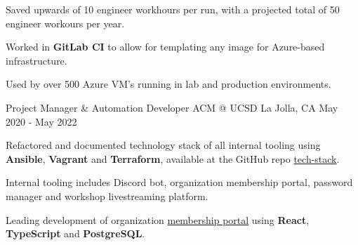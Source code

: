 \begin{cventries}
{\begin{cvitems}
        \item {Saved upwards of 10 engineer workhours per run, with a projected total of 50 engineer workours per year.}
        \item {Worked in \textbf{GitLab CI} to allow for templating any image for Azure-based infrastructure.}
        \item {Used by over 500 Azure VM's running in lab and production environments.}
      \end{cvitems}
    }
  \cventry
  {Project Manager \& Automation Developer}
  {ACM @ UCSD}
  {La Jolla, CA}
  {May 2020 - May 2022}
  {
    \begin{cvitems}
      \item {Refactored and documented technology stack of all internal tooling using \textbf{Ansible}, \textbf{Vagrant} and \textbf{Terraform}, available at the GitHub repo \href{https://github.com/acmucsd/tech-stack}{tech-stack}.}
      \item {Internal tooling includes Discord bot, organization membership portal, password manager and workshop livestreaming platform.}
      \item {Leading development of organization \href{https://github.com/acmucsd/membership-portal-ui}{membership portal} using \textbf{React}, \textbf{TypeScript} and \textbf{PostgreSQL}.}
    \end{cvitems}
  }
\end{cventries}
